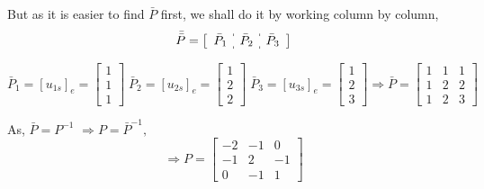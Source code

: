 \documentclass[a4paper]{article}
\begin{document}
\begin{qalist}
			But as it is easier to find $\bar{P}$ first, we shall do it by working column by column, 
			\renewcommand{\arraystretch}{1.5}
			\[\bar{\bar{P}} = \left[\begin{array}{c:c:c} {\bar{P}}_{1} &  {\bar{P}}_{2} & {\bar{P}}_{3}\end{array}\right]\]
			
			\begin{equation}{\bar{P}}_{1} = {[{u}_{1s}]}_{e} = \begin{bmatrix}1 \\ 1 \\ 1\end{bmatrix} \;
			{\bar{P}}_{2} = {[{u}_{2s}]}_{e} = \begin{bmatrix}1 \\ 2 \\ 2\end{bmatrix} \;
			{\bar{P}}_{3} = {[{u}_{3s}]}_{e} = \begin{bmatrix}1 \\ 2 \\ 3\end{bmatrix} 
			\Rightarrow \bar{P} = \begin{bmatrix} 1 & 1 & 1 \\ 1 & 2 & 2 \\ 1 & 2 & 3\end{bmatrix}\end{equation}
			
			As, $\bar{P} = {P}^{-1}$ $\Rightarrow P = {\bar{P}}^{-1}, $
			\begin{equation}
				\Rightarrow P = \begin{bmatrix}-2 & -1 & 0 \\ -1 & 2 & -1 \\ 0 & -1 & 1\end{bmatrix}
			\end{equation}
		

\end{qalist}
\end{document}
